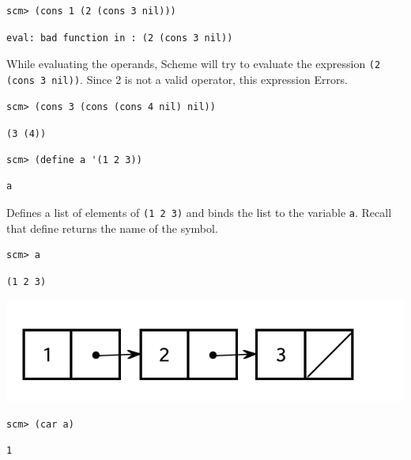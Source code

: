 \begin{lstlisting}
scm> (cons 1 (2 (cons 3 nil)))
\end{lstlisting}
\begin{solution}[.25in]
\begin{lstlisting}
eval: bad function in : (2 (cons 3 nil))
\end{lstlisting}
While evaluating the operands, Scheme will try to evaluate the expression \texttt{(2 (cons 3 nil))}. Since 2 is not a valid operator, this expression Errors.
\end{solution}

\begin{lstlisting}
scm> (cons 3 (cons (cons 4 nil) nil))
\end{lstlisting}

\begin{solution}[.5in]
\lstinline$(3 (4))$
\end{solution}

\begin{lstlisting}
scm> (define a '(1 2 3))
\end{lstlisting}
\begin{solution}[.25in]
\begin{lstlisting}
a
\end{lstlisting}
Defines a list of elements of \texttt{(1 2 3)} and binds the list to the variable \texttt{a}. Recall that define returns the name of the symbol.
\end{solution}

\begin{lstlisting}
scm> a
\end{lstlisting}
\begin{solution}[.25in]
\begin{lstlisting}
(1 2 3)
\end{lstlisting}
\includegraphics[scale=0.7]{scheme_lists_6.png}
\end{solution}

\begin{lstlisting}
scm> (car a)
\end{lstlisting}
\begin{solution}[.25in]
\begin{lstlisting}
1
\end{lstlisting}
\end{solution}

